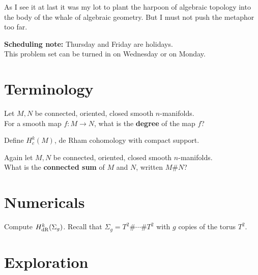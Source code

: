 \documentclass{homework}
\author{Jim Fowler}
\begin{document}
\maketitle

\begin{inspiration} As I see it at last it was my lot to plant the
harpoon of algebraic topology into the body of the whale of algebraic
geometry. But I must not push the metaphor too far.  
\end{inspiration}

\textbf{Scheduling note:} Thursday and Friday are holidays. \\[1ex] This problem set can be turned in on Wednesday or on Monday.

\section{Terminology}

\begin{problem} Let $M, N$ be connected, oriented, closed smooth
$n$-manifolds. \\ For a smooth map $f : M \to N$, what is the
\textbf{degree} of the map $f$?
\end{problem}

\begin{problem}
 Define $H_c^k(M)$, de Rham cohomology with compact support. 
\end{problem}

\begin{problem}
  Again let $M, N$ be connected, oriented, closed smooth $n$-manifolds.\\  What is the \textbf{connected sum} of $M$ and $N$, written $M \# N$?
\end{problem}

\section{Numericals}

\begin{problem}
Compute $H_{\operatorname{dR}}^k(\Sigma_g)$.  Recall that $\Sigma_g = T^2 \# \cdots \# T^2$ with $g$ copies of the torus $T^2$.
\end{problem}

\section{Exploration}
\end{document}
